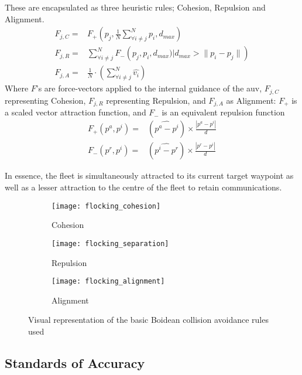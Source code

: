 These are encapsulated as three heuristic rules; Cohesion, Repulsion and Alignment.
\begin{align}
  F_{j,C}=& F_+\left(p_j, \frac{1}{N}\sum\limits_{\forall i \ne j}^N{p_i}, d_{max}\right)\label{eq:fa}\\
  F_{j,R}=& \sum\limits_{\forall i \ne j}^N F_-\left(p_j, p_i, d_{max}) \big| d_{max}>\|p_i-p_j\|\right)\label{eq:fr}\\
  F_{j,A}=& \frac{1}{N}\cdot\left(\sum\limits_{\forall i \ne j}^N \hat{v_i}\right)\label{eq:fc}
\end{align}
Where $F$'s are force-vectors applied to the internal guidance of the \gls{auv}, $F_{j,C}$ representing Cohesion, $F_{j,R}$ representing Repulsion, and $F_{j,A}$ as Alignment: $F_+$ is a scaled vector attraction function, and $F_-$ is an equivalent repulsion function
\begin{align}
  F_+(p^a, p^i)=&(\widehat{p^a-p^i}) \times \frac{|p^a-p^i|}{d}\\
  F_-(p^r, p^i)=&(\widehat{p^i-p^r}) \times \frac{|p^r-p^i|}{d}
\end{align}

In essence, the fleet is simultaneously attracted to its current target waypoint as well as a lesser attraction to the centre of the fleet to retain communications.

\begin{figure*}
  \centering
  \begin{subfigure}[t]{0.3\textwidth}
    \centering
    \texttt{[image: flocking\_cohesion]}
    \caption{Cohesion}
  \end{subfigure}
  \begin{subfigure}[t]{0.3\textwidth}
    \centering
    \texttt{[image: flocking\_separation]}
    \caption{Repulsion}
  \end{subfigure}
  \begin{subfigure}[t]{0.3\textwidth}
    \centering
    \texttt{[image: flocking\_alignment]}
    \caption{Alignment}
  \end{subfigure}
  \caption{Visual representation of the basic Boidean collision avoidance rules used}
  \label{fig:boids}
\end{figure*}


\subsection{Standards of Accuracy}\label{sec:standards}

